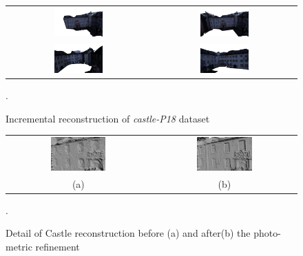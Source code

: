 \begin{figure}[t]
\centering
\begin{tabular}{cc}
\includegraphics[width=0.35\textwidth]{./img/ch-incr-dens/castle01}&
\includegraphics[width=0.35\textwidth]{./img/ch-incr-dens/castle02}\\
\includegraphics[width=0.35\textwidth]{./img/ch-incr-dens/castle03}&
\includegraphics[width=0.35\textwidth]{./img/ch-incr-dens/castle04}
\end{tabular}
\label{fig:castle}
\caption{Incremental reconstruction of \emph{castle-P18} dataset}.
\end{figure}

\begin{figure}[tpb]
\centering
\begin{tabular}{cc}
\includegraphics[width=0.4\textwidth]{./img/ch-incr-dens/castle12}&
\includegraphics[width=0.4\textwidth]{./img/ch-incr-dens/castle11}\\
(a)&(b)
\end{tabular}
\label{fig:detailcastle}
\caption{Detail of Castle reconstruction before (a) and after(b) the photo-metric refinement}.
\end{figure}





